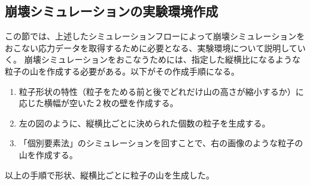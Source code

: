 \documentclass[12pt]{ltjsarticle}
\begin{document}
\subsection{崩壊シミュレーションの実験環境作成}
この節では、上述したシミュレーションフローによって崩壊シミュレーションをおこない応力データを取得するために必要となる、実験環境について説明していく。
崩壊シミュレーションをおこなうためには、指定した縦横比になるような粒子の山を作成する必要がある。以下がその作成手順になる。
\begin{enumerate}
  \item 粒子形状の特性（粒子をためる前と後でどれだけ山の高さが縮小するか）に応じた横幅が空いた２枚の壁を作成する。
  \item 左の図のように、縦横比ごとに決められた個数の粒子を生成する。
  \item 「個別要素法」のシミュレーションを回すことで、右の画像のような粒子の山を作成する。
\end{enumerate}
以上の手順で形状、縦横比ごとに粒子の山を生成した。
\end{document}
